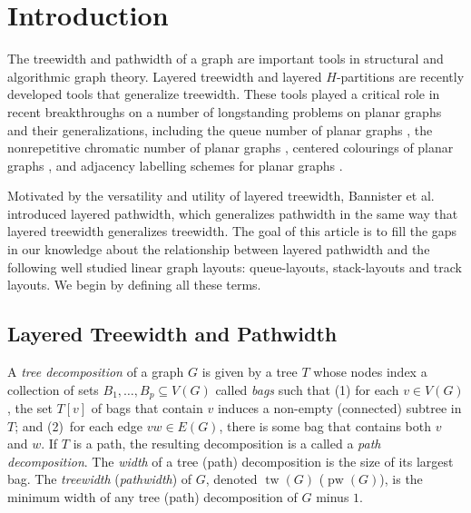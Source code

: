 \documentclass{jgaa-art}
\newcommand{\etal}{et al.}
\DeclareMathOperator{\pw}{pw}
\DeclareMathOperator{\tw}{tw}
\begin{document}
\Body

\section{Introduction}

The treewidth and pathwidth of a graph are important tools in
structural and algorithmic graph theory. Layered treewidth and layered
$H$-partitions are recently developed tools that generalize
treewidth. These tools played a critical role in recent breakthroughs on a
number of longstanding problems on planar graphs and their generalizations, including the queue number of planar graphs \cite{dujmovic.joret.ea:planar}, the nonrepetitive chromatic number of planar graphs \cite{dujmovic.esperet.ea:planar}, centered colourings of planar graphs \cite{debski.felsner.ea:improved}, and adjacency labelling schemes for planar graphs \cite{bonamy.gavoille.ea:shorter,dujmovic.esperet.ea:adjacency}.



Motivated
by the versatility and utility of layered treewidth, Bannister
\etal\ \cite{DBLP:conf/gd/BannisterDDEW16,bannister2018track}
introduced  layered pathwidth, which generalizes pathwidth in the same way
that layered treewidth generalizes treewidth.  The goal of this article is to fill the gaps in our knowledge about
the relationship between layered pathwidth and the following well studied
linear graph layouts: queue-layouts, stack-layouts and track
layouts.  We begin by defining all these terms.

\subsection{Layered Treewidth and Pathwidth}

A {\em tree decomposition} of a graph $G$ is given by a tree $T$ whose
nodes index a collection of sets $B_1,\ldots,B_p\subseteq V(G)$ called
\emph{bags} such that (1) for each $v\in V(G)$, the set $T[v]$ of bags that contain $v$ induces a
     non-empty (connected) subtree in $T$; and (2)~for each edge $vw\in E(G)$, there is some bag that contains both $v$ and $w$. If $T$ is a path, the resulting decomposition is a called a \emph{path decomposition}. The \emph{width} of a tree (path)
   decomposition is the size of its largest bag.  The \emph{treewidth}
   (\emph{pathwidth}) of $G$, denoted $\tw(G)$ ($\pw(G)$), is the minimum width of any tree (path) decomposition of $G$ minus $1$.
\end{document}
